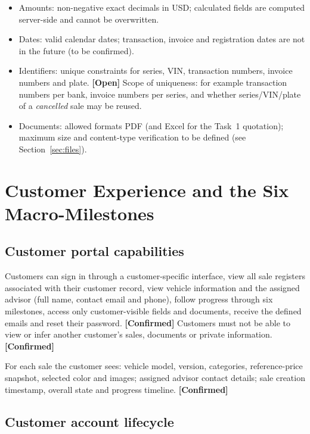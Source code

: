 \documentclass[11pt,a4paper]{article}
\newcommand{\tagconf}{\textcolor{green!45!black}{\textbf{[Confirmed]}}}
\newcommand{\tagopen}{\textcolor{red!70!black}{\textbf{[Open]}}}
\begin{document}
\begin{itemize}
	\item Amounts: non-negative exact decimals in USD; calculated fields are
	      computed server-side and cannot be overwritten.
	\item Dates: valid calendar dates; transaction, invoice and registration dates
	      are not in the future (to be confirmed).
	\item Identifiers: unique constraints for series, VIN, transaction numbers,
	      invoice numbers and plate. \tagopen{} Scope of uniqueness: for example
	      transaction numbers per bank, invoice numbers per series, and whether
	      series/VIN/plate of a \emph{cancelled} sale may be reused.
	\item Documents: allowed formats PDF (and Excel for the Task~1 quotation); maximum size and content-type verification to be defined (see Section~\ref{sec:files}).
\end{itemize}

\section{Customer Experience and the Six Macro-Milestones}

\subsection{Customer portal capabilities}

Customers can sign in through a customer-specific interface, view all sale registers associated with their customer record, view vehicle information and the assigned advisor (full name, contact email and phone), follow progress through six milestones, access only customer-visible fields and documents, receive the defined emails and reset their password. \tagconf{} Customers must not be able to view or infer another customer's sales, documents or private information. \tagconf{}

For each sale the customer sees: vehicle model, version, categories,
reference-price snapshot, selected color and images; assigned advisor contact
details; sale creation timestamp, overall state and progress timeline.
\tagconf{}

\subsection{Customer account lifecycle}
\end{document}
